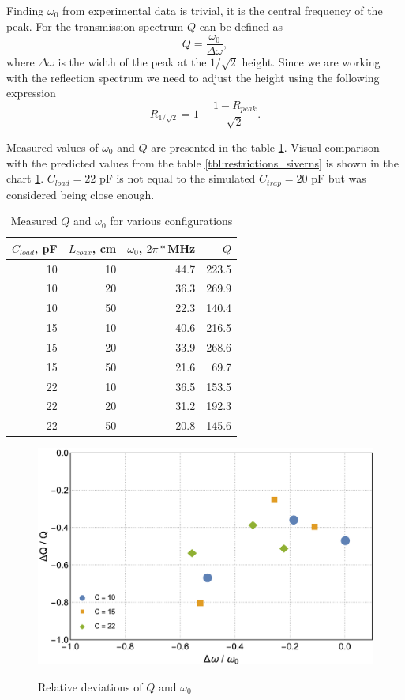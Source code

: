 \FloatBarrier
Finding $\omega_0$ from experimental data is trivial, it is the central frequency of the peak. For the transmission spectrum $Q$ can be defined as
\begin{equation}
	Q = \frac{\omega_0}{\Delta \omega},
\end{equation}
where $\Delta \omega$ is the width of the peak at the $1/\sqrt{2}$ height. Since we are working with the reflection spectrum we need to adjust the height using the following expression
\begin{equation}
	R_{1/\sqrt{2}} = 1 - \frac{1 - R_{peak}}{\sqrt{2}}.
	\label{eq:reflection_height}
\end{equation}

Measured values of $\omega_0$ and $Q$ are presented in the table \ref{tbl:Q_w_results}. Visual comparison with the predicted values from the table \ref{tbl:restrictions_siverns} is shown in the chart \ref{fig:Q_w_deviation}. $C_{load} = 22$ pF is not equal to the simulated $C_{trap} = 20$ pF but was considered being close enough.
\begin{table}[h]
\centering
\begin{tabular}{| r | r || r | r |}
	\hline
	$C_{load}$, pF & $L_{coax}$, cm & $\omega_0$, $2\pi*$MHz & $Q$\\
	\hline \hline
	10 & 10 & 44.7 & 223.5\\
	\hline
	10 & 20 & 36.3 & 269.9\\
	\hline
	10 & 50 & 22.3 & 140.4\\
	\hline
	15 & 10 & 40.6 & 216.5\\
	\hline
	15 & 20 & 33.9 & 268.6\\
	\hline
	15 & 50 & 21.6 & 69.7\\
	\hline
	22 & 10 & 36.5 & 153.5\\
	\hline
	22 & 20 & 31.2 & 192.3\\
	\hline
	22 & 50 & 20.8 & 145.6\\
	\hline
\end{tabular}
\label{tbl:Q_w_results}
\caption{Measured $Q$ and $\omega_0$ for various configurations}
\end{table}

\begin{figure}[h]
	\centering
	\includegraphics[width=\textwidth]{images/Q_w_plot}
	\label{fig:Q_w_deviation}
	\caption{Relative deviations of $Q$ and $\omega_0$}
\end{figure}
